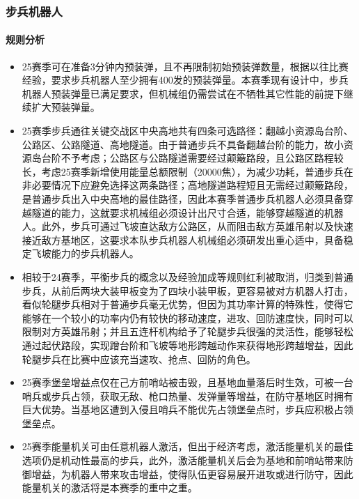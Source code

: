 \subsubsection{步兵机器人}

    \paragraph{规则分析}


        \begin{itemize}
            \item 25赛季可在准备3分钟内预装弹，且不再限制初始预装弹数量，根据以往比赛经验，要求步兵机器人至少拥有400发的预装弹量。本赛季现有设计中，步兵机器人预装弹量已满足要求，但机械组仍需尝试在不牺牲其它性能的前提下继续扩大预装弹量。
            \item 25赛季步兵通往关键交战区中央高地共有四条可选路径：翻越小资源岛台阶、公路区、公路隧道、高地隧道。由于普通步兵不具备翻越台阶的能力，故小资源岛台阶不予考虑；公路区与公路隧道需要经过颠簸路段，且公路区路程较长，考虑25赛季新增使用能量总额限制（20000焦），为减少功耗，普通步兵在非必要情况下应避免选择这两条路径；高地隧道路程短且无需经过颠簸路段，是普通步兵出入中央高地的最佳路径，因此本赛季普通步兵机器人必须具备穿越隧道的能力，这就要求机械组必须设计出尺寸合适，能够穿越隧道的机器人。此外，步兵可通过飞坡直达敌方公路区，从而阻击敌方英雄吊射以及快速接近敌方基地区，这要求本队步兵机器人机械组必须研发出重心适中，具备稳定飞坡能力的步兵机器人。
            \item 相较于24赛季，平衡步兵的概念以及经验加成等规则红利被取消，归类到普通步兵，从前后两块大装甲板变为了四块小装甲板，更容易被对方机器人打击，看似轮腿步兵相对于普通步兵毫无优势，但因为其功率计算的特殊性，使得它能够在一个较小的功率内仍有较快的移动速度，进攻、回防速度快，同时可以限制对方英雄吊射；并且五连杆机构给予了轮腿步兵很强的灵活性，能够轻松通过起伏路段，实现蹭台阶和飞坡等地形跨越动作来获得地形跨越增益，因此轮腿步兵在比赛中应该充当速攻、抢点、回防的角色。
            \item 25赛季堡垒增益点仅在己方前哨站被击毁，且基地血量落后时生效，可被一台哨兵或步兵占领，获取无敌、枪口热量、发弹量等增益，在防守基地区时拥有巨大优势。当基地区遭到入侵且哨兵不能优先占领堡垒点时，步兵应积极占领堡垒点。
            \item 25赛季能量机关可由任意机器人激活，但出于经济考虑，激活能量机关的最佳选项仍是机动性最高的步兵，此外，激活能量机关后会为基地和前哨站带来防御增益，为机器人带来攻击增益，使得队伍更容易展开进攻或进行防守，因此能量机关的激活将是本赛季的重中之重。

\end{itemize}
